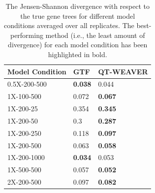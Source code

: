 \documentclass[10pt,a4paper]{article}
\begin{document}
\begin{table}[h!]
    \centering
    \caption{The Jensen-Shannon divergence with respect to the true gene trees for different model conditions averaged over all replicates. The best-performing method (i.e., the least amount of divergence) for each model condition has been highlighted in bold.}
    \label{tab:37-divergence}
    \begin{tabular}{|C{3cm}|C{3cm}|C{3cm}|}
        \hline
        \textbf{Model Condition} & \textbf{GTF} & \textbf{QT-WEAVER} \\
        \hline
        0.5X-200-500 & \textbf{0.038} & 0.044 \\
        \hline
        1X-100-500 & 0.072 & \textbf{0.067} \\
        \hline
        1X-200-25 & 0.354 & \textbf{0.345} \\
        \hline
        1X-200-50 & 0.3 & \textbf{0.287} \\
        \hline
        1X-200-250 & 0.118 & \textbf{0.097} \\
        \hline
        1X-200-500 & 0.063 & \textbf{0.058} \\
        \hline
        1X-200-1000 & \textbf{0.034} & 0.053 \\
        \hline
        1X-500-500 & 0.057 & \textbf{0.052} \\
        \hline
        2X-200-500 & 0.097 & \textbf{0.082} \\
        \hline
    \end{tabular}
\end{table}
\end{document}
